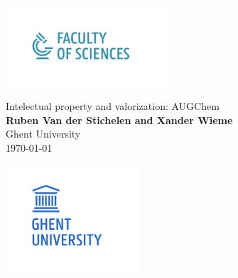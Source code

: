 \documentclass[%
    paper=A4,               %
    twoside=true,           %
    openany,              %
    parskip=full,           %
    chapterprefix=true,     %
    11pt,                   %
    headings=normal,        %
    bibliography=totoc,     %
    listof=totoc,           %
    titlepage=on,           %
    captions=tableabove,    %
    draft=false,            %
]{scrreprt}
\title{\reportTitle}
\author{\reportName\\GQCG}
\newcommand{\reportTitle}{\textcolor{ugent_blue}{Intelectual property and valorization: AUGChem}}
\newcommand{\reportName}{\textbf{Ruben Van der Stichelen and Xander Wieme}}
\numberwithin{equation}{section}
\begin{document}
    \begin{titlepage}
        \hspace{-1cm}\includegraphics[height=3cm]{faculty.png}
        \begin{center}
            \vspace{2cm}
            \Huge{\reportTitle} \\
            \vspace{1cm}
            \Large{\reportName} \\
            \vspace{2cm}
            \vspace{0.5cm}
            \large{Ghent University} \\ 
            \large{\today}
        \end{center}
        \vspace{4cm}
        \hspace{-1cm}\includegraphics[height=4cm]{UGent.png}
    \end{titlepage}


    \setcounter{tocdepth}{2}		%

    \setcounter{page}{1}			%
    \pagestyle{maincontentstyle} 	%
\end{document}
